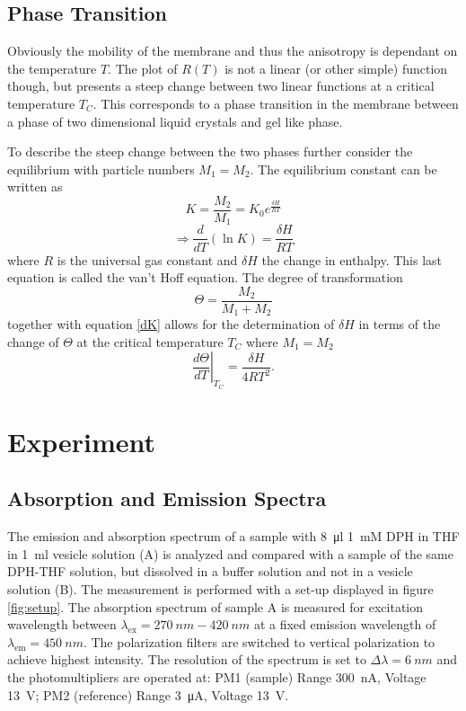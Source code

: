 \documentclass{scrartcl}
\numberwithin{equation}{section}
\numberwithin{figure}{section}
\numberwithin{table}{section}
\newcommand{\eq}[2]{\begin{equation}#1\label{#2}\end{equation}}
\begin{document}
\subsection{Phase Transition}
Obviously the mobility of the membrane and thus the anisotropy is dependant on the temperature $T$. The plot of $R(T)$ is not a linear (or other simple) function though, but presents a steep change between two linear functions at a critical temperature $T_C$. This corresponds to a phase transition in the membrane between a phase of two dimensional liquid crystals and gel like phase.

To describe the steep change between the two phases further consider the equilibrium with particle numbers $M_1=M_2$. The equilibrium constant can be written as
\eq{K = \frac{M_2}{M_1} = K_0 e^{\frac{\delta H}{R T}}}{K}
\eq{\Rightarrow \frac{d}{dT}(\ln K) = \frac{\delta H}{R T}}{dK}
where $R$ is the universal gas constant and $\delta H$ the change in enthalpy. This last equation is called the van't Hoff equation. The degree of transformation 
\eq{\Theta = \frac{M_2}{M_1+M_2}}{Theta}
together with equation \ref{dK} allows for the determination of $\delta H$ in terms of the change of $\Theta$ at the critical temperature $T_C$ where $M_1=M_2$
\eq{{\left.\frac{d\Theta}{dT}\right |}_{T_C} = \frac{\delta H}{4 R T^2} .}{dTheta}

\clearpage

\section{Experiment}
\subsection{Absorption and Emission Spectra}
The emission and absorption spectrum of a sample with \SI{8}{\micro l} \SI{1}{mM} DPH in THF in \SI{1}{ml} vesicle solution (A) is analyzed and compared with a sample of the same DPH-THF solution, but dissolved in a buffer solution and not in a vesicle solution (B). The measurement is performed with a set-up displayed in figure \ref{fig:setup}. The absorption spectrum of sample A is measured for excitation wavelength between $\lambda_\text{ex}=\SI{270}{nm} - \SI{420}{nm}$ at a fixed emission wavelength of $\lambda_\text{em}=\SI{450}{nm}$. The polarization filters are switched to vertical polarization to achieve highest intensity. The resolution of the spectrum is set to $\Delta \lambda =\SI{6}{nm}$ and the photomultipliers  are operated at: PM1 (sample) Range \SI{300}{nA}, Voltage \SI{13}{V}; PM2 (reference) Range \SI{3}{\micro A}, Voltage \SI{13}{V}.
\end{document}
